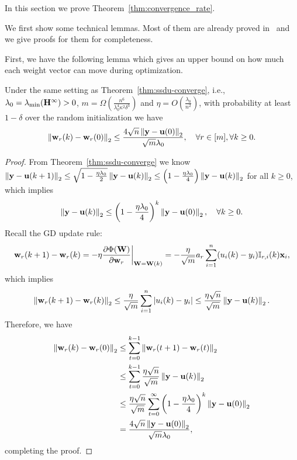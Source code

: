 
In this section we prove Theorem~\ref{thm:convergence_rate}.


We first show some technical lemmas. Most of them are already proved in~\citep{du2018provably} and we give proofs for them for completeness.


First, we have the following lemma which gives an upper bound on how much each weight vector can move during optimization.

\begin{lem} \label{lem:weight-vector-movement}
	Under the same setting as Theorem~\ref{thm:ssdu-converge}, i.e., $\lambda_0 = \lambda_{\min}(\mathbf{H}^\infty) >0$, $m = \Omega\left( \frac{n^6}{\lambda_0^4 \kappa^2 \delta^3 } \right)$ and $\eta = O\left( \frac{\lambda_0}{n^2} \right)$,
	with probability at least $1-\delta$ over the random initialization we have
	\begin{equation*}
	\left\|\mathbf{w}_r(k) - \mathbf{w}_r(0)\right\|_2 \le \frac{4\sqrt n \left\|\mathbf{y}- \mathbf{u}(0)\right\|_2}{\sqrt m \lambda_0}, \quad \forall r\in[m], \forall k \ge 0.
	\end{equation*}
\end{lem}
\begin{proof}
	From Theorem~\ref{thm:ssdu-converge} we know $ \left\|\mathbf{y}- \mathbf{u}(k+1)\right\|_2 \le \sqrt{1 - \frac{\eta\lambda_0}{2}} \left\|\mathbf{y}- \mathbf{u}(k)\right\|_2 \le \left( 1 - \frac{\eta\lambda_0}{4} \right) \left\|\mathbf{y}- \mathbf{u}(k)\right\|_2$ for all $k\ge0$, which implies
	\begin{equation} \label{eqn:y-u(k)_bound}
	\left\|\mathbf{y}- \mathbf{u}(k)\right\|_2 \le \left( 1 - \frac{\eta\lambda_0}{4} \right)^k \left\|\mathbf{y}- \mathbf{u}(0)\right\|_2, \quad \forall k\ge 0.
	\end{equation}
	Recall the GD update rule:
	\begin{equation*}
	\mathbf{w}_r(k+1) - \mathbf{w}_r(k) = - \eta \frac{\partial \Phi(\mathbf{W})}{\partial \mathbf{w}_r} \bigg|_{\mathbf{W} = \mathbf{W}(k)} = -\frac{\eta}{\sqrt m} a_r \sum_{i=1}^n (u_i(k) - y_i) \mathbb{I}_{r, i}(k) \mathbf{x}_i,
	\end{equation*}
	which implies
	\begin{equation*}
	\left\|\mathbf{w}_r(k+1) - \mathbf{w}_r(k)\right\|_2 \le \frac{\eta}{\sqrt m} \sum_{i=1}^n |u_i(k) - y_i| \le \frac{\eta \sqrt n}{\sqrt m} \left\|\mathbf{y} - \mathbf{u}(k)\right\|_2.
	\end{equation*}
	Therefore, we have
	\begin{align*}
	\left\| \mathbf{w}_r(k) - \mathbf{w}_r(0) \right\|_2
	& \le \sum_{t=0}^{k-1} \left\|\mathbf{w}_r(t+1) - \mathbf{w}_r(t)\right\|_2 \\
	& \le \sum_{t=0}^{k-1} \frac{\eta \sqrt n}{\sqrt m} \left\|\mathbf{y} - \mathbf{u}(k)\right\|_2 \\
	& \le \frac{\eta \sqrt n}{\sqrt m}  \sum_{t=0}^{\infty} \left( 1 - \frac{\eta\lambda_0}{4} \right)^k \left\|\mathbf{y}- \mathbf{u}(0)\right\|_2 \\
	&= \frac{4\sqrt n \left\|\mathbf{y}- \mathbf{u}(0)\right\|_2}{\sqrt m \lambda_0},
	\end{align*}
	completing the proof.
\end{proof}

